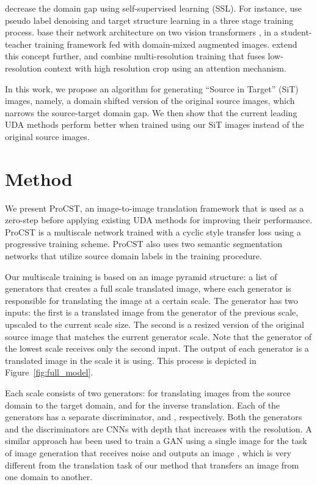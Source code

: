 \documentclass[letterpaper]{article} \usepackage[]{aaai23}  \usepackage{times}  \usepackage{helvet}  \usepackage{courier}  \usepackage[hyphens]{url}  \usepackage{graphicx} \urlstyle{rm} \def\UrlFont{\rm}  \usepackage{natbib}  \usepackage{caption} \frenchspacing  \setlength{\pdfpagewidth}{8.5in} \setlength{\pdfpageheight}{11in} \usepackage{algorithm}
\begin{document}
\citet{zhang2021prototypical, hoyer2021daformer} decrease the domain gap using self-supervised learning (SSL). For instance, \citet{zhang2021prototypical} use pseudo label denoising and target structure learning in a three stage training process. \citet{hoyer2021daformer} base their network architecture on two vision transformers \cite{liang2021swinir, dosovitskiy2020image}, in a student-teacher training framework fed with domain-mixed augmented images. \citet{hoyer2022hrda} extend this concept further, and combine multi-resolution training that fuses low-resolution context with high resolution crop using an attention mechanism. 


In this work, we propose an algorithm for generating ``Source in Target'' (SiT) images, namely, a domain shifted version of the original source images, which narrows the source-target domain gap. We then show that the current leading UDA methods perform better when trained using our SiT images instead of the original source images.




\section{Method}
\label{sec:method}

We present ProCST, an image-to-image translation framework that is used as a zero-step before applying existing UDA methods for improving their performance. ProCST is a multiscale network trained with a cyclic style transfer loss using a progressive training scheme. 
ProCST also uses two semantic segmentation networks that utilize source domain labels in the training procedure. 

Our multiscale training is based on an image pyramid structure: a list of generators that creates a full scale translated image, where each generator is responsible for translating the image at a certain scale. The generator has two inputs: the first is a translated image from the generator of the previous scale, upscaled to the current scale size. The second is a resized version of the original source image that matches the current generator scale. Note that the generator of the lowest scale receives only the second input. The output of each generator is a translated image in the scale it is using. This process is depicted in Figure~\ref{fig:full_model}.

Each scale consists of two generators:  for translating images from the source domain to the target domain, and  for the inverse translation. Each of the generators has a separate discriminator,  and , respectively. Both the generators and the discriminators are CNNs with depth that increases with the resolution. A similar approach has been used to train a GAN using a single image for the task of image generation that receives noise and outputs an image \cite{shaham2019singan}, which is very different from the translation task of our method that transfers an image from one domain to another.  
\end{document}
